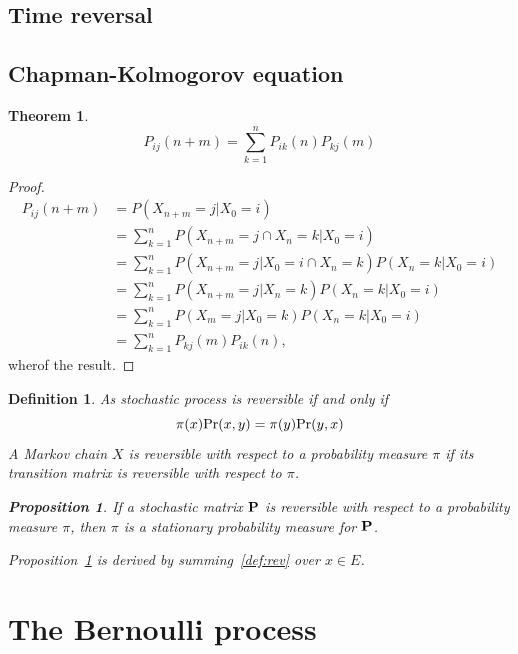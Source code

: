 \documentclass[12pt,a4paper]{article}
\newtheorem{theorem}{Theorem}
\newtheorem{proposition}{Proposition}
\newtheorem{definition}{Definition}
\newcommand{\bP}{\bold P}
\begin{document}
\subsection{Time reversal}

\subsection{Chapman-Kolmogorov equation}
\begin{theorem}
	$$
	P_{ij}(n+m) = \sum_{k=1}^n P_{ik}(n) P_{kj}(m)
	$$
\end{theorem}
\begin{proof}
	\begin{equation}
		\begin{alignedat}{2}
			P_{ij}(n+m) &= P(X_{n+m} = j|X_0 = i)\\
			&= \sum_{k=1}^n P(X_{n+m} = j \cap  X_n = k|X_0 = i)\\
			&= \sum_{k=1}^n P(X_{n+m} = j |X_0 = i\cap  X_n = k) P(X_n = k |X_0 = i)\\
			&= \sum_{k=1}^n P(X_{n+m} = j | X_n = k) P(X_n = k |X_0 = i)\\
			&= \sum_{k=1}^n P(X_{m} = j | X_0 = k) P(X_n = k |X_0 = i)\\
			&= \sum_{k=1}^n P_{kj}(m) P_{ik}(n), 
		\end{alignedat}
	\end{equation}
	wherof the result.
\end{proof}

\begin{definition}
	As stochastic process is reversible if and only if 
	\begin{equation}\label{def:rev}
		\pi(x){\rm Pr}(x, y) = \pi(y){\rm Pr}(y, x)
	\end{equation}
	A Markov chain $X$ is reversible with respect to a probability measure $\pi$ if its transition matrix is reversible with respect to $\pi$.
	\begin{proposition}\label{prop:rev}
		If a stochastic matrix $\bP$ is reversible with respect to a probability measure $\pi$, then $\pi$ is a stationary probability measure for $\bP$.
	\end{proposition}
	Proposition~\ref{prop:rev} is derived by summing~\eqref{def:rev} over $x \in E$.
	
\end{definition}

\newpage
\section{The Bernoulli process}
\end{document}
